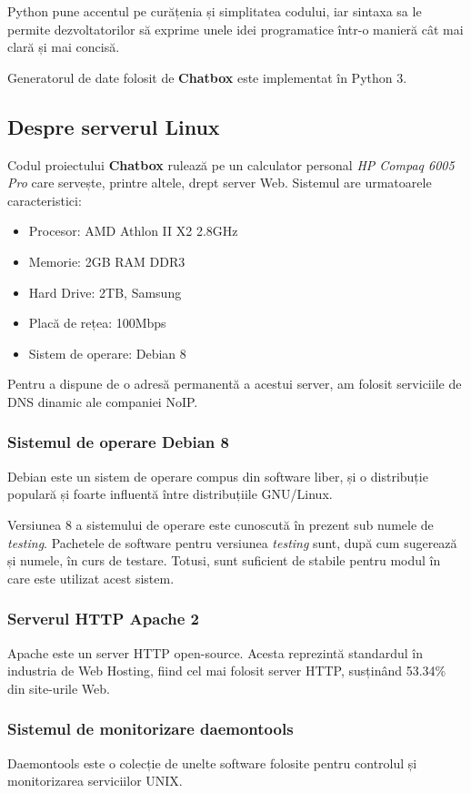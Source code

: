 \documentclass[12pt,a4paper]{article}
\begin{document}
Python pune accentul pe curățenia și simplitatea codului, iar sintaxa sa le permite dezvoltatorilor să exprime unele idei programatice într-o manieră cât mai clară și mai concisă.

Generatorul de date folosit de \textbf{Chatbox} este implementat în Python 3.

\subsection{Despre serverul Linux}
Codul proiectului \textbf{Chatbox} rulează pe un calculator personal
 \textit{HP Compaq 6005 Pro}
care servește, printre altele, drept server Web. 
Sistemul are urmatoarele caracteristici:
\begin{itemize}
  \item Procesor: AMD Athlon II X2 2.8GHz
  \item Memorie: 2GB RAM DDR3
  \item Hard Drive: 2TB, Samsung
  \item Placă de rețea: 100Mbps
  \item Sistem de operare: Debian 8
\end{itemize}

Pentru a dispune de o adresă permanentă a acestui server, 
am folosit serviciile de DNS dinamic ale companiei NoIP\cite{noip}.

\subsubsection{Sistemul de operare Debian 8}
Debian\cite{debian} este un sistem de operare compus din software liber\cite{free}, și o distribuție populară și foarte influentă între distribuțiile GNU/Linux.

Versiunea 8 a sistemului de operare este cunoscută în prezent sub 
numele de \textit{testing}. Pachetele de software pentru versiunea 
\textit{testing} sunt, după cum sugerează și numele, în curs de testare.
Totusi, sunt suficient de stabile pentru modul  în care 
este utilizat acest sistem.

\subsubsection{Serverul HTTP Apache 2}
Apache este un server HTTP open-source. Acesta reprezintă standardul în 
industria de Web Hosting, fiind cel mai folosit server HTTP, susținând 
53.34\% din site-urile Web\cite{apache53}.

\subsubsection{Sistemul de monitorizare daemontools}
Daemontools\cite{daemon} este o colecție de unelte software folosite pentru 
controlul și monitorizarea serviciilor UNIX. 
\end{document}

